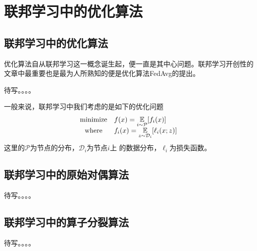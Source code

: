 \chapter{\hspace{-1mm}\bf 联邦学习中的优化算法}
\label{chap2}


\section{联邦学习中的优化算法}

优化算法自从联邦学习这一概念诞生起，便一直是其中心问题。联邦学习开创性的文章\cite{mcmahan2017fed_avg}中最重要也是最为人所熟知的便是优化算法FedAvg的提出。

待写。。。。

一般来说，联邦学习中我们考虑的是如下的优化问题
\begin{equation}
\label{eq:fl-basic}
\begin{array}{cl}
\text{minimize} & f(x) = \operatorname*{\mathbb{E}}\limits_{i \sim {\mathcal{P}}} [f_i(x)] \\
\text{where} & f_i(x) = \operatorname*{\mathbb{E}}\limits_{z \sim \mathcal{D}_i} [\ell_i(x; z)]
\end{array}
\end{equation}
这里的$\mathcal{P}$为节点的分布，$\mathcal{D}_i$为节点$i$上 的数据分布，$\ell_i$为损失函数。

\section{联邦学习中的原始对偶算法}

待写。。。。

\section{联邦学习中的算子分裂算法}

待写。。。。
